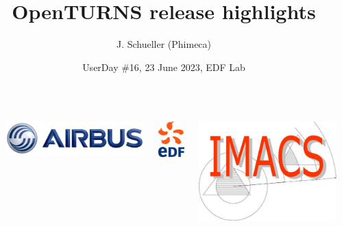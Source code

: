 \documentclass[aspectratio=169]{beamer}
\title[OpenTURNS]{OpenTURNS release highlights}
\author[OpenTURNS et al.]{J. Schueller (Phimeca)}
\date[]{UserDay \#16, 23 June 2023, EDF Lab}
\begin{document}

  \begin{frame}
  \titlepage

  \begin{columns}
  \begin{column}[t]{0.05\textwidth}
        \end{column}
  
  \begin{center}
\includegraphics[height=0.04\textheight]{figures/airbus-logo-3d-blue.png}
\end{center}

  \begin{center}
\includegraphics[height=0.09\textheight]{figures/logo-edf.jpg}
\end{center}

  \begin{center}
\includegraphics[height=0.09\textheight]{figures/imacs-logo.jpg}
\end{center}


\end{columns}
\end{frame}
\end{document}
